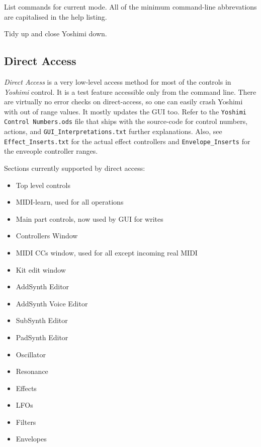       List commands for current mode.  All of the minimum command-line
      abbrevations are capitalised in the help listing.

         Tidy up and close Yoshimi down.

\subsection{Direct Access}
\label{subsec:command_line_direct_access}

   \textsl{Direct Access} is a very low-level access method for most of the
   controls in \textsl{Yoshimi} control.
   It is a test feature accessible only from the command line.
   There are virtually no error checks on direct-access, so one can easily
   crash Yoshimi with out of range values.
   It mostly updates the GUI too.
   Refer to the \texttt{Yoshimi Control Numbers.ods} file that ships with the
   source-code
   for control numbers, actions, and \texttt{GUI\_Interpretations.txt}
   further explanations.
   Also, see \texttt{Effect\_Inserts.txt} for the actual effect controllers and
   \texttt{Envelope\_Inserts} for the enveople controller ranges.

   Sections currently supported by direct access:

   \begin{itemize}
      \item Top level controls
      \item MIDI-learn, used for all operations
      \item Main part controls, now used by GUI for writes
      \item Controllers Window
      \item MIDI CCs window, used for all except incoming real MIDI
      \item Kit edit window
      \item AddSynth Editor
      \item AddSynth Voice Editor
      \item SubSynth Editor
      \item PadSynth Editor
      \item Oscillator
      \item Resonance
      \item Effects
      \item LFOs
      \item Filters
      \item Envelopes
   \end{itemize}

